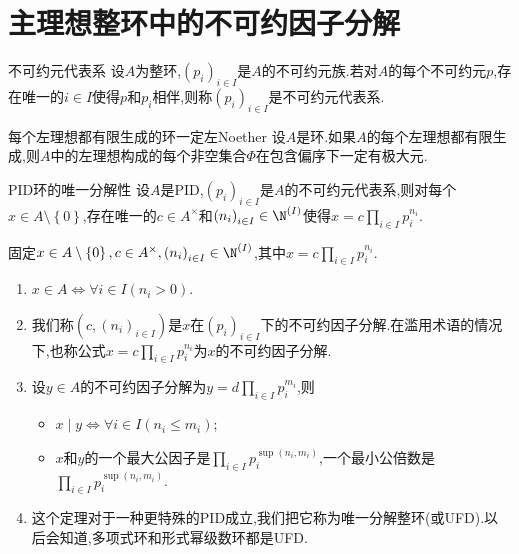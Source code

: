 \section{主理想整环中的不可约因子分解}

\begin{definition}{不可约元代表系}{}
	设$A$为整环,$\left(p_{i}\right)_{i\in I}$是$A$的不可约元族.若对$A$的每个不可约元$p$,存在唯一的$i\in I$使得$p$和$p_{i}$相伴,则称$\left(p_{i}\right)_{i\in I}$是不可约元代表系.
\end{definition}

\begin{lemma}{每个左理想都有限生成的环一定左Noether}{}
	设$A$是环.如果$A$的每个左理想都有限生成,则$A$中的左理想构成的每个非空集合$\Phi$在包含偏序下一定有极大元.
\end{lemma}

\begin{theorem}{PID环的唯一分解性}{}
	设$A$是PID,$\left(p_{i}\right)_{i\in I}$是$A$的不可约元代表系,则对每个$x\in A\setminus\left\{0\right\}$,存在唯一的$c\in A^{\times}$和$\left(n_{i}\right)_{i\in I}\in\N^{\left(I\right)}$使得$x=c\prod\limits_{i\in I}p_{i}^{n_{i}}$.
\end{theorem}

\begin{remark}{}{}
	固定$x\in A\setminus\left\{0\right\},c\in A^{\times},\left(n_{i}\right)_{i\in I}\in\N^{\left(I\right)}$,其中$x=c\prod\limits_{i\in I}p_{i}^{n_{i}}$.
	\begin{enumerate}
		\item $x\in A\iff\forall i\in I\left(n_{i}>0\right)$.
		\item 我们称$\left(c,\left(n_{i}\right)_{i\in I}\right)$是$x$在$\left(p_{i}\right)_{i\in I}$下的不可约因子分解.在滥用术语的情况下,也称公式$x=c\prod\limits_{i\in I}p_{i}^{n_{i}}$为$x$的不可约因子分解.
		\item 设$y\in A$的不可约因子分解为$y=d\prod\limits_{i\in I}p_{i}^{m_{i}}$,则
		\begin{itemize}
			\item $x\mid y\iff\forall i\in I\left(n_{i}\leq m_{i}\right)$;
			\item $x$和$y$的一个最大公因子是$\prod\limits_{i\in I}p_{i}^{\sup\left(n_{i},m_{i}\right)}$,一个最小公倍数是$\prod\limits_{i\in I}p_{i}^{\sup\left(n_{i},m_{i}\right)}$.
		\end{itemize}
		\item 这个定理对于一种更特殊的PID成立,我们把它称为唯一分解整环(或UFD).以后会知道,多项式环和形式幂级数环都是UFD.
	\end{enumerate}
\end{remark}

